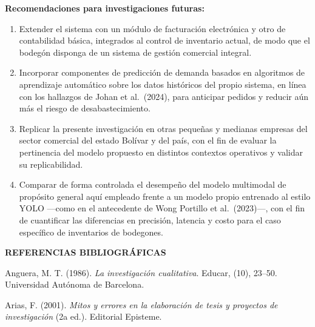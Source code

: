\documentclass[12pt, letterpaper]{report}
\begin{document}
\textbf{Recomendaciones para investigaciones futuras:}

\begin{enumerate}[leftmargin=*, resume]
  \item Extender el sistema con un módulo de facturación electrónica
        y otro de contabilidad básica, integrados al control de
        inventario actual, de modo que el bodegón disponga de un
        sistema de gestión comercial integral.

  \item Incorporar componentes de predicción de demanda basados en
        algoritmos de aprendizaje automático sobre los datos
        históricos del propio sistema, en línea con los hallazgos de
        Johan et al.\ (2024), para anticipar pedidos y reducir aún más
        el riesgo de desabastecimiento.

  \item Replicar la presente investigación en otras pequeñas y
        medianas empresas del sector comercial del estado Bolívar y
        del país, con el fin de evaluar la pertinencia del modelo
        propuesto en distintos contextos operativos y validar su
        replicabilidad.

  \item Comparar de forma controlada el desempeño del modelo
        multimodal de propósito general aquí empleado frente a un
        modelo propio entrenado al estilo YOLO ---como en el
        antecedente de Wong Portillo et al.\ (2023)---, con el fin de
        cuantificar las diferencias en precisión, latencia y costo
        para el caso específico de inventarios de bodegones.
\end{enumerate}

\clearpage
{}
\begin{center}
{\fontsize{14}{16}\selectfont\bfseries REFERENCIAS BIBLIOGRÁFICAS\par}
\end{center}
\vspace{12pt}

\setlength{\parindent}{0pt}
\setlength{\parskip}{8pt}

Anguera, M. T. (1986). \textit{La investigación cualitativa}.
Educar, (10), 23--50. Universidad Autónoma de Barcelona.

Arias, F. (2001). \textit{Mitos y errores en la elaboración de tesis y
proyectos de investigación} (2a ed.). Editorial Episteme.
\end{document}
